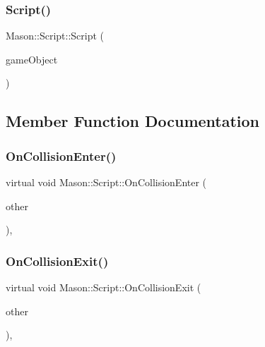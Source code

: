 \subsubsection{\texorpdfstring{Script()}{Script()}}
{\footnotesize\ttfamily Mason\+::\+Script\+::\+Script (\begin{DoxyParamCaption}\item[{std\+::shared\+\_\+ptr$<$ \hyperlink{class_mason_1_1_game_object}{Game\+Object} $>$}]{game\+Object }\end{DoxyParamCaption})\hspace{0.3cm}{\ttfamily [inline]}}



\subsection{Member Function Documentation}
\hypertarget{class_mason_1_1_script_a1088013d6edc47d74643aa48a7cbbbdf}{}\label{class_mason_1_1_script_a1088013d6edc47d74643aa48a7cbbbdf} 
\subsubsection{\texorpdfstring{On\+Collision\+Enter()}{OnCollisionEnter()}}
{\footnotesize\ttfamily virtual void Mason\+::\+Script\+::\+On\+Collision\+Enter (\begin{DoxyParamCaption}\item[{\hyperlink{class_mason_1_1_game_object}{Game\+Object} $\ast$}]{other }\end{DoxyParamCaption})\hspace{0.3cm}{\ttfamily [inline]}, {\ttfamily [virtual]}}

\hypertarget{class_mason_1_1_script_a04d09648b7dba1bcb0a0ad3c3570e2f3}{}\label{class_mason_1_1_script_a04d09648b7dba1bcb0a0ad3c3570e2f3} 
\subsubsection{\texorpdfstring{On\+Collision\+Exit()}{OnCollisionExit()}}
{\footnotesize\ttfamily virtual void Mason\+::\+Script\+::\+On\+Collision\+Exit (\begin{DoxyParamCaption}\item[{\hyperlink{class_mason_1_1_game_object}{Game\+Object} $\ast$}]{other }\end{DoxyParamCaption})\hspace{0.3cm}{\ttfamily [inline]}, {\ttfamily [virtual]}}

